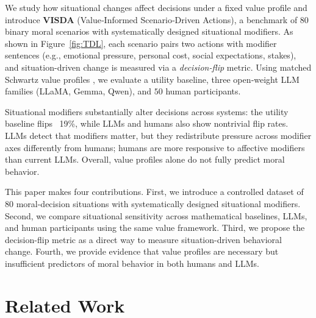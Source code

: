 \documentclass[11pt]{article}
\begin{document}
We study how situational changes affect decisions under a fixed value profile and introduce \textbf{VISDA} (Value‑Informed Scenario‑Driven Actions), a benchmark of 80 binary moral scenarios with systematically designed situational modifiers. As shown in Figure~\ref{fig:TDL}, each scenario pairs two actions with modifier sentences (e.g., emotional pressure, personal cost, social expectations, stakes), and situation-driven change is measured via a \emph{decision-flip} metric. Using matched Schwartz value profiles \citep{schwartz1992universals}, we evaluate a utility baseline, three open‑weight LLM families (LLaMA, Gemma, Qwen), and $50$ human participants.

Situational modifiers substantially alter decisions across systems: the utility baseline flips ~19\%, while LLMs and humans also show nontrivial flip rates. LLMs detect that modifiers matter, but they redistribute pressure across modifier axes differently from humans; humans are more responsive to affective modifiers than current LLMs. Overall, value profiles alone do not fully predict moral behavior.

This paper makes four contributions.  
First, we introduce a controlled dataset of 80 moral-decision situations with systematically designed situational modifiers.  
Second, we compare situational sensitivity across mathematical baselines, LLMs, and human participants using the same value framework.  
Third, we propose the decision-flip metric as a direct way to measure situation-driven behavioral change.  
Fourth, we provide evidence that value profiles are necessary but insufficient predictors of moral behavior in both humans and LLMs.  


\section{Related Work}
\label{sec:related}
\end{document}
